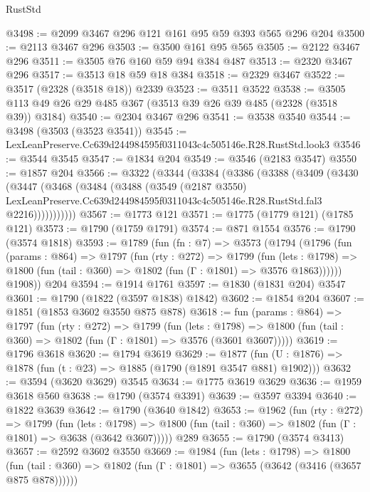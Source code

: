 \begin{lexlean}{RustStd}
\begin{coremodule}
@3498 := @2099 @3467 @296 @121 @161 @95 @59 @393 @565 @296 @204
@3500 := @2113 @3467 @296
@3503 := @3500 @161 @95 @565
@3505 := @2122 @3467 @296
@3511 := @3505 @76 @160 @59 @94 @384 @487
@3513 := @2320 @3467 @296
@3517 := @3513 @18 @59 @18 @384
@3518 := @2329 @3467
@3522 := @3517 (@2328 (@3518 @18)) @2339
@3523 := @3511 @3522
@3538 := @3505 @113 @49 @26 @29 @485 @367 (@3513 @39 @26 @39 @485 (@2328 (@3518 @39)) @3184)
@3540 := @2304 @3467 @296
@3541 := @3538 @3540
@3544 := @3498 (@3503 (@3523 @3541))
@3545 := LexLeanPreserve.Cc639d244984595f0311043c4c505146e.R28.RustStd.look3
@3546 := @3544 @3545
@3547 := @1834 @204
@3549 := @3546 (@2183 @3547)
@3550 := @1857 @204
@3566 := @3322
    (@3344
      (@3384
        (@3386
          (@3388
            (@3409
              (@3430
                (@3447
                  (@3468
                    (@3484
                      (@3488
                        (@3549
                          (@2187 @3550)
                          LexLeanPreserve.Cc639d244984595f0311043c4c505146e.R28.RustStd.fal3
                          @2216)))))))))))
@3567 := @1773 @121
@3571 := @1775 (@1779 @121) (@1785 @121)
@3573 := @1790 (@1759 @1791)
@3574 := @871 @1554
@3576 := @1790 (@3574 @1818)
@3593 := @1789
    (fun (fn : @7) =>
    @3573
      (@1794
        (@1796
          (fun (params : @864) =>
          @1797
            (fun (rty : @272) =>
            @1799
              (fun (lets : @1798) =>
              @1800 (fun (tail : @360) => @1802 (fun (Γ : @1801) => @3576 @1863))))))
        @1908))
    @204
@3594 := @1914 @1761
@3597 := @1830 (@1831 @204) @3547
@3601 := @1790 (@1822 (@3597 @1838) @1842)
@3602 := @1854 @204
@3607 := @1851 (@1853 @3602 @3550 @875 @878)
@3618 := fun (params : @864) =>
  @1797
    (fun (rty : @272) =>
    @1799
      (fun (lets : @1798) =>
      @1800 (fun (tail : @360) => @1802 (fun (Γ : @1801) => @3576 (@3601 @3607)))))
@3619 := @1796 @3618
@3620 := @1794 @3619
@3629 := @1877 (fun (U : @1876) => @1878 (fun (t : @23) => @1885 (@1790 (@1891 @3547 @881) @1902)))
@3632 := @3594 (@3620 @3629) @3545
@3634 := @1775 @3619 @3629
@3636 := @1959 @3618 @560
@3638 := @1790 (@3574 @3391)
@3639 := @3597 @3394
@3640 := @1822 @3639
@3642 := @1790 (@3640 @1842)
@3653 := @1962
    (fun (rty : @272) =>
    @1799
      (fun (lets : @1798) =>
      @1800 (fun (tail : @360) => @1802 (fun (Γ : @1801) => @3638 (@3642 @3607)))))
    @289
@3655 := @1790 (@3574 @3413)
@3657 := @2592 @3602 @3550
@3669 := @1984
    (fun (lets : @1798) =>
    @1800 (fun (tail : @360) => @1802 (fun (Γ : @1801) => @3655 (@3642 (@3416 (@3657 @875 @878))))))

\end{coremodule}
\end{lexlean}
